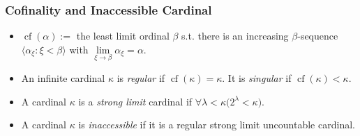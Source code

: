 \documentclass[UTF8,aspectratio=43,11pt,colorlinks,compress,openany]{beamer}%
\begin{document}
\begin{frame}\frametitle{Cofinality and Inaccessible Cardinal}
\begin{itemize}
\item $\operatorname{cf}(\alpha):=$ the least limit ordinal $\beta$ s.t. there is an increasing $\beta$-sequence $\langle\alpha_\xi:\xi<\beta\rangle$ with $\lim\limits_{\xi\to\beta}\alpha_\xi=\alpha$.
\item An infinite cardinal $\kappa$ is \emph{regular} if $\operatorname{cf}(\kappa)=\kappa$. It is \emph{singular} if $\operatorname{cf}(\kappa)<\kappa$.
\item A cardinal $\kappa$ is a \emph{strong limit} cardinal if $\forall \lambda<\kappa\big(2^\lambda<\kappa\big)$.
\item A cardinal $\kappa$ is \emph{inaccessible} if it is a regular strong limit uncountable cardinal.
\end{itemize}
\end{frame}
\end{document}
